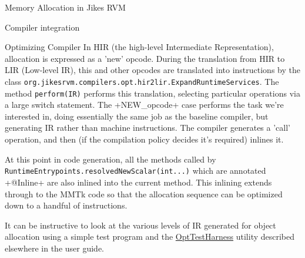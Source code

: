 \begin{section}{Memory Allocation in Jikes RVM}
\begin{subsection}{Compiler integration}
\begin{subsubsection}{Optimizing Compiler}
In HIR (the high-level Intermediate Representation), allocation is expressed as a 'new' opcode.  During the translation from HIR to LIR (Low-level IR), this and other opcodes are translated into instructions by the class \texttt{org.jikes\-rvm.com\-pi\-lers.opt.hir2lir.Ex\-pand\-Run\-time\-Ser\-vices}.  The method \texttt{per\-form(IR)} performs this translation, selecting particular operations via a large switch statement.  The \spverb+NEW_opcode+ case performs the task we're interested in, doing essentially the same job as the baseline compiler, but generating IR rather than machine instructions.  The compiler generates a 'call' operation, and then (if the compilation policy decides it's required) inlines it.

At this point in code generation, all the methods called by \texttt{Run\-ti\-me\-En\-try\-points.re\-sol\-ved\-New\-Sca\-lar(int...)} which are annotated \spverb+@Inline+ are also inlined into the current method.  This inlining extends through to the MMTk code so that the allocation sequence can be optimized down to a handful of instructions.

It can be instructive to look at the various levels of IR generated for object allocation using a simple test program and the \hyperref[subsec:opttestharness]{OptTestHarness} utility described elsewhere in the user guide.

\end{subsubsection}

\end{subsection}

\end{section}

